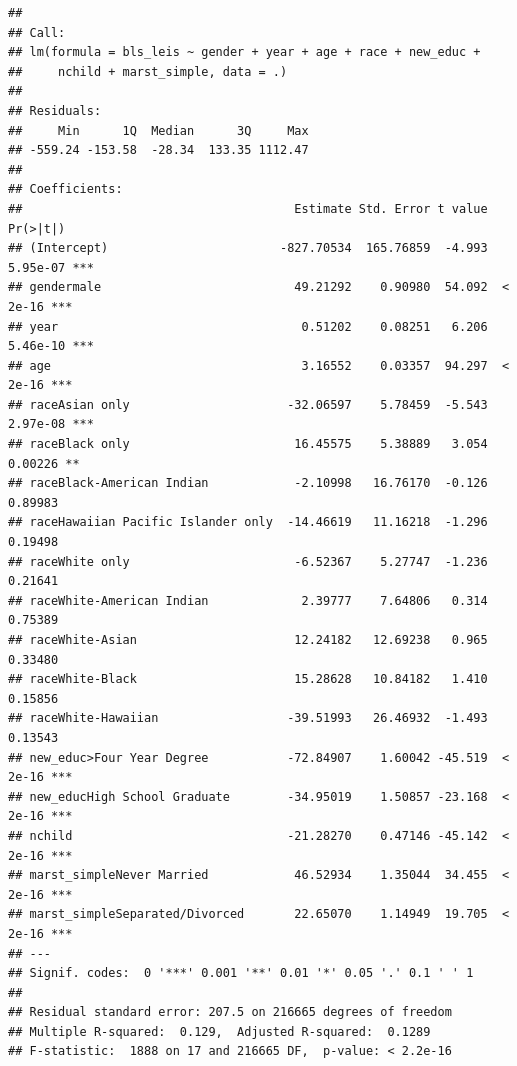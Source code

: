 \documentclass[
]{article}
\begin{document}
\begin{verbatim}
## 
## Call:
## lm(formula = bls_leis ~ gender + year + age + race + new_educ + 
##     nchild + marst_simple, data = .)
## 
## Residuals:
##     Min      1Q  Median      3Q     Max 
## -559.24 -153.58  -28.34  133.35 1112.47 
## 
## Coefficients:
##                                      Estimate Std. Error t value Pr(>|t|)    
## (Intercept)                        -827.70534  165.76859  -4.993 5.95e-07 ***
## gendermale                           49.21292    0.90980  54.092  < 2e-16 ***
## year                                  0.51202    0.08251   6.206 5.46e-10 ***
## age                                   3.16552    0.03357  94.297  < 2e-16 ***
## raceAsian only                      -32.06597    5.78459  -5.543 2.97e-08 ***
## raceBlack only                       16.45575    5.38889   3.054  0.00226 ** 
## raceBlack-American Indian            -2.10998   16.76170  -0.126  0.89983    
## raceHawaiian Pacific Islander only  -14.46619   11.16218  -1.296  0.19498    
## raceWhite only                       -6.52367    5.27747  -1.236  0.21641    
## raceWhite-American Indian             2.39777    7.64806   0.314  0.75389    
## raceWhite-Asian                      12.24182   12.69238   0.965  0.33480    
## raceWhite-Black                      15.28628   10.84182   1.410  0.15856    
## raceWhite-Hawaiian                  -39.51993   26.46932  -1.493  0.13543    
## new_educ>Four Year Degree           -72.84907    1.60042 -45.519  < 2e-16 ***
## new_educHigh School Graduate        -34.95019    1.50857 -23.168  < 2e-16 ***
## nchild                              -21.28270    0.47146 -45.142  < 2e-16 ***
## marst_simpleNever Married            46.52934    1.35044  34.455  < 2e-16 ***
## marst_simpleSeparated/Divorced       22.65070    1.14949  19.705  < 2e-16 ***
## ---
## Signif. codes:  0 '***' 0.001 '**' 0.01 '*' 0.05 '.' 0.1 ' ' 1
## 
## Residual standard error: 207.5 on 216665 degrees of freedom
## Multiple R-squared:  0.129,  Adjusted R-squared:  0.1289 
## F-statistic:  1888 on 17 and 216665 DF,  p-value: < 2.2e-16
\end{verbatim}
\end{document}
